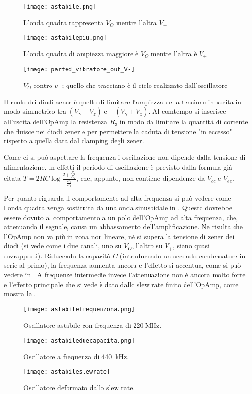 \begin{figure}[h]
	\centering
	\texttt{[image: astabile.png]}
	\caption{L'onda quadra rappresenta $V_O$ mentre l'altra $V_-$.}
	\label{f:astabile}
\end{figure}

\begin{figure}[h]
	\centering
	\texttt{[image: astabilepiu.png]}
	\caption{L'onda quadra di ampiezza maggiore è $V_O$ mentre l'altra è $V_+$}
	\label{f:astabile+}
\end{figure}

\begin{figure}[h]
	\centering
	\texttt{[image: parted\_vibratore\_out\_V-]}
	\caption{$V_{O}$ contro ${v_-}$; quello che tracciano è il ciclo realizzato dall'oscillatore}
	\label{f:vibrociclo}
\end{figure}

Il ruolo dei diodi zener è quello di limitare l'ampiezza della tensione in uscita in modo simmetrico tra $(V_\gamma + V_z)$ e $-(V_\gamma + V_z)$. Al comtempo si inserisce all'uscita dell'OpAmp la resistenza $R_3$ in modo da limitare la quantità di corrente che fluisce nei diodi zener e per permettere la caduta di tensione "in eccesso" rispetto a quella data dal clamping degli zener.


Come ci si può aspettare la frequenza i oscillazione non dipende dalla tensione di alimentazione. In effetti il periodo di oscillazione è previsto dalla formula già citata $T=2RC\log\frac{2+\frac{R_1}{R_2}}{\frac{R_1}{R_2}}$, che, appunto, non contiene dipendenze da $V_{cc}$ e $V_{ee}$.


Per quanto riguarda il comportamento ad alta frequenza si può vedere come l'onda quadra venga sostituita da una onda sinusoidale in . Questo dovrebbe essere dovuto al comportamento a un polo dell'OpAmp ad alta frequenza, che, attenuando il segnale, causa un abbassamento dell'amplificazione. Ne risulta che l'OpAmp non va più in zona non lineare, né si supera la tensione di zener dei diodi (si vede come i due canali, uno su $V_O$, l'altro su $V_+$, siano quasi sovrapposti). Riducendo la capacità $C$ (introducendo un secondo condensatore in serie al primo), la frequenza aumenta ancora e l'effetto si accentua, come si può vedere in . A frequenze intermedie invece l'attenuazione non è ancora molto forte e l'effetto principale che si vede è dato dallo slew rate finito dell'OpAmp, come mostra la .

\begin{figure}[h]
	\centering
	\texttt{[image: astabilefrequenzona.png]}
	\caption{Oscillatore astabile con frequenza di $\SI{220}{\mega\Hz}$.}
	\label{f:freqzona}
\end{figure}

\begin{figure}[h]
	\centering
	\texttt{[image: astabileduecapacita.png]}
	\caption{Oscillatore a frequenza di \SI{440}{\kHz}.}
	\label{f:doppiac}
\end{figure}

\begin{figure}[h]
	\centering
	\texttt{[image: astabileslewrate]}
	\caption{Oscillatore deformato dallo slew rate.}
	\label{f:slewvibra}
\end{figure}
